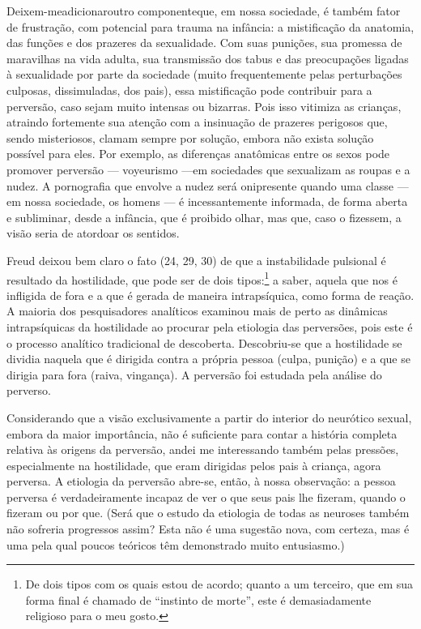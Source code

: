 Deixem-me\idxpervmiste[|(] adicionar\idxmist[|(] outro componente\idxsexuamis[|(] que, em nossa sociedade, é
também fator de frustração, com potencial para trauma na infância: a
mistificação da anatomia, das funções e dos prazeres da sexualidade.
Com suas punições, sua promessa de maravilhas na vida adulta, sua
transmissão dos tabus e das preocupações ligadas à sexualidade por
parte da sociedade (muito frequentemente pelas perturbações culposas,
dissimuladas, dos pais), essa mistificação pode contribuir para a
perversão, caso sejam muito intensas ou bizarras. Pois isso vitimiza as
crianças, atraindo fortemente sua atenção com a insinuação de prazeres
perigosos que, sendo misteriosos, clamam sempre por solução, embora não
exista solução possível para eles. Por exemplo, as diferenças
anatômicas entre os sexos pode promover perversão --- voyeurismo ---\idxvoy[|(]
em sociedades que sexualizam as roupas\idxroup{} e a nudez. A pornografia que
envolve a nudez será onipresente quando uma classe --- em nossa
sociedade, os homens --- é incessantemente informada, de forma aberta
e subliminar, desde a infância, que é proibido olhar, mas que, caso o
fizessem, a visão seria de atordoar os sentidos.

Freud\idxfreudinsti{} deixou bem claro o fato (24, 29, 30) de que a instabilidade
pulsional é resultado da hostilidade, que pode ser de dois
tipos:\footnote{ De dois tipos com os quais estou de acordo; quanto a um
terceiro, que em sua forma final é chamado de ``instinto
de morte'', este é demasiadamente religioso para o meu
gosto.} a saber, aquela que nos é infligida de fora e
a que é gerada de maneira intrapsíquica, como forma de reação. A
maioria dos pesquisadores analíticos examinou mais de perto as
dinâmicas intrapsíquicas da hostilidade ao procurar pela etiologia das
perversões, pois este é o processo analítico tradicional de descoberta.
Descobriu-se que a hostilidade se dividia naquela que é dirigida contra
a própria pessoa\idxhostculp{} (culpa,\idxculpah{} punição) e a que se dirigia para fora (raiva,
vingança). A perversão foi estudada pela análise do perverso.

Considerando que a visão exclusivamente a partir do interior do
neurótico sexual, embora da maior importância, não é suficiente para
contar a história completa relativa às origens da perversão, andei me
interessando também pelas pressões, especialmente na hostilidade, que
eram dirigidas pelos pais à criança,\idxhostrela{} agora perversa. A etiologia da
perversão abre-se, então, à nossa observação: a pessoa perversa é
verdadeiramente incapaz de ver o que seus pais lhe fizeram, quando o
fizeram ou por que. (Será que o estudo da etiologia de todas as
neuroses também não sofreria progressos assim? Esta não é uma sugestão
nova, com certeza, mas é uma pela qual poucos teóricos têm demonstrado
muito entusiasmo.)

